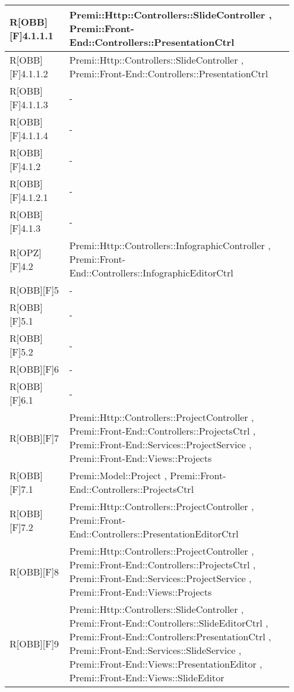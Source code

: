 \begin{table}[h]
	\begin{center}
		\begin{tabular}{|p{0.2\linewidth}|p{0.75\linewidth}|}
			\toprule
			R[OBB][F]4.1.1.1 & Premi::Http::Controllers::SlideController , Premi::Front-End::Controllers::PresentationCtrl\\
		\midrule
			R[OBB][F]4.1.1.2 & Premi::Http::Controllers::SlideController , Premi::Front-End::Controllers::PresentationCtrl\\
		\midrule
			R[OBB][F]4.1.1.3 & -\\
		\midrule
			R[OBB][F]4.1.1.4 & -\\
		\midrule
			R[OBB][F]4.1.2 & -\\
		\midrule
			R[OBB][F]4.1.2.1 & -\\
		\midrule
			R[OBB][F]4.1.3 & -\\
		\midrule
			R[OPZ][F]4.2 & Premi::Http::Controllers::InfographicController , Premi::Front-End::Controllers::InfographicEditorCtrl\\
		\midrule
			R[OBB][F]5  & -\\
		\midrule
			R[OBB][F]5.1 & -\\
		\midrule
			R[OBB][F]5.2 & -\\
		\midrule
			R[OBB][F]6 & -\\
		\midrule
			R[OBB][F]6.1 & -\\
		\midrule
			R[OBB][F]7 & Premi::Http::Controllers::ProjectController , Premi::Front-End::Controllers::ProjectsCtrl , Premi::Front-End::Services::ProjectService , Premi::Front-End::Views::Projects\\
		\midrule
			R[OBB][F]7.1 & Premi::Model::Project , Premi::Front-End::Controllers::ProjectsCtrl\\
		\midrule
			R[OBB][F]7.2 & Premi::Http::Controllers::ProjectController , Premi::Front-End::Controllers::PresentationEditorCtrl\\
		\midrule
			R[OBB][F]8 & Premi::Http::Controllers::ProjectController , Premi::Front-End::Controllers::ProjectsCtrl , Premi::Front-End::Services::ProjectService , Premi::Front-End::Views::Projects\\
		\midrule
			R[OBB][F]9 & Premi::Http::Controllers::SlideController , Premi::Front-End::Controllers::SlideEditorCtrl , Premi::Front-End::Controllers:PresentationCtrl , Premi::Front-End::Services::SlideService  , Premi::Front-End::Views::PresentationEditor , Premi::Front-End::Views::SlideEditor\\
		\bottomrule
		\end{tabular}
	\end{center}
\end{table}
	

